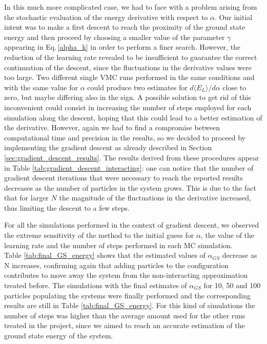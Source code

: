 In this much more complicated case, we had to face with a problem arising from the stochastic evaluation of the energy derivative with respect to $\alpha$. Our initial intent was to make a first descent to reach the proximity of the ground state energy and then proceed by choosing a smaller value of the parameter $\gamma$ appearing in Eq.\,\ref{alpha_k} in order to perform a finer search. However, the reduction of the learning rate revealed to be insufficient to guarantee the correct continuation of the descent, since the fluctuations in the derivative values were too large. Two different single VMC runs performed in the same conditions and with the same value for $\alpha$ could produce two estimates for $d\langle E_L \rangle / d\alpha$ close to zero, but maybe differing also in the sign. A possible solution to get rid of this inconvenient could consist in increasing the number of steps employed for each simulation along the descent, hoping that this could lead to a better estimation of the derivative. However, again we had to find a compromise between computational time and precision in the results, so we decided to proceed by implementing the gradient descent as already described in Section \ref{sec:gradient_descent_results}. The results derived from these procedures appear in Table \ref{tab:gradient_descent_interacting}: one can notice that the number of gradient descent iterations that were necessary to reach the reported results decreases as the number of particles in the system grows. This is due to the fact that for larger $N$ the magnitude of the fluctuations in the derivative increased, thus limiting the descent to a few steps. 

For all the simulations performed in the context of gradient descent, we observed the extreme sensitivity of the method to the initial guess for $\alpha$, the value of the learning rate and the number of steps performed in each MC simulation. \\


Table \ref{tab:final_GS_energy} shows that the estimated values of $\alpha_{GS}$ decrease as N increases, confirming again that adding particles to the configuration contributes to move away the system from the non-interacting approximation treated before. The simulations with the final estimates of $\alpha_{GS}$ for 10, 50 and 100 particles populating the systems were finally performed and the corresponding results are still in Table \ref{tab:final_GS_energy}. For this kind of simulations the number of steps was higher than the average amount used for the other runs treated in the project, since we aimed to reach an accurate estimation of the ground state energy of the system.

